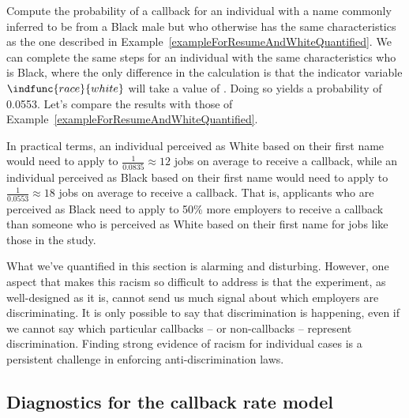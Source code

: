 \begin{examplewrap}
\begin{nexample}{Compute the probability of a callback
    for an individual with a name commonly inferred
    to be from a Black male but who otherwise
    has the same characteristics as the one described
    in Example~\ref{exampleForResumeAndWhiteQuantified}.}
  We can complete the same steps for an individual
  with the same characteristics who is Black,
  where the only difference in the calculation is that
  the indicator variable
  $\indfunc{race}{white}$ will take a value of .
  Doing so yields a probability of 0.0553.
  Let's compare the results with those of
  Example~\ref{exampleForResumeAndWhiteQuantified}.

  In practical terms, an individual perceived
  as White based on their first name would need to
  apply to $\frac{1}{0.0835} \approx 12$ jobs on average
  to receive a callback,
  while an individual perceived as Black
  based on their first name
  would need
  to apply to $\frac{1}{0.0553} \approx 18$ jobs on average
  to receive a callback.
  That is, applicants who are perceived as
  Black need to apply to 50\% more employers
  to receive a callback than someone who is perceived
  as White based on their first name for jobs like
  those in the study.
\end{nexample}
\end{examplewrap}

What we've quantified in this section is alarming and disturbing.
However, one aspect that makes this racism so difficult to
address is that the experiment, as well-designed as it is,
cannot send us much signal about which employers are
discriminating.
It is only possible to say that discrimination is happening,
even if we cannot say which particular callbacks
-- or non-callbacks -- represent discrimination.
Finding strong evidence of racism for individual cases is
a persistent challenge in enforcing anti-discrimination laws.



\subsection{Diagnostics for the callback rate model}
\label{logistic_regr_diagnostics_subsection}

